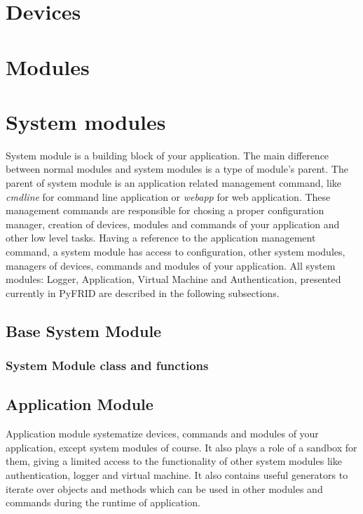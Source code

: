 \documentclass[letterpaper,10pt,english]{sphinxmanual}
\begin{document}
\chapter{Devices}
\label{device::doc}\label{device:devices}\label{device:module-pyfrid.core.device}

\chapter{Modules}
\label{module:module-pyfrid.core.module}\label{module::doc}\label{module:modules}

\chapter{System modules}
\label{sysmod:system-modules}\label{sysmod::doc}
System module is a building block of your application. The main difference between normal modules and system modules is a type of module's parent.
The parent of system module is an application related management command, like \emph{cmdline} for command line application or \emph{webapp} for web application.
These management commands are responsible for chosing a proper configuration manager, creation of devices, modules and commands of your application
and other low level tasks. Having a reference to the application management command, a system module has access to configuration, other system modules,
managers of devices, commands and modules of your application. All system modules: Logger, Application, Virtual Machine and Authentication, presented
currently in PyFRID are described in the following subsections.


\section{Base System Module}
\label{sysmod:base-system-module}

\subsection{System Module class and functions}
\label{sysmod:module-pyfrid.core.sysmod}\label{sysmod:system-module-class-and-functions}

\section{Application Module}
\label{sysmod:application-module}
Application module systematize devices, commands and modules of your application, except system modules of course.
It also plays a role of a sandbox for them, giving a limited access to the functionality of other system modules like authentication,
logger and virtual machine. It also contains useful generators to iterate over objects and methods which can be used in other modules
and commands during the runtime of application.
\end{document}
